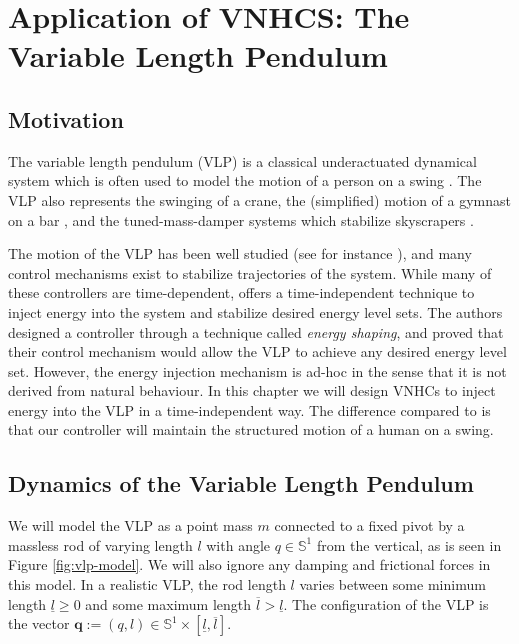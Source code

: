 
\chapter{Application of VNHCS: The Variable Length Pendulum}\label{sec:vlp}
\section{Motivation}
The variable length pendulum (VLP) is a classical underactuated dynamical system
which is often used to model the motion of a person on a swing
\cite{pumping_swing_standing_squatting,how_to_pump_a_swing}.
The VLP also represents the swinging of a crane, the (simplified) motion of a
gymnast on a bar \cite{pendulum_length_giant_gymnastics}, and the
tuned-mass-damper systems which stabilize skyscrapers
\cite{vlp_tuned_mass_damper}.

The motion of the VLP has been well studied (see for instance
\cite{dynamics_periodic_vlp}), and many control mechanisms exist
to stabilize trajectories of the system. While many of these controllers 
are time-dependent, \cite{vlp_energy_shaping}
offers a time-independent technique to inject energy into the system and
stabilize desired energy level sets. The authors designed a controller through a
technique called \textit{energy shaping}, and proved that their control
mechanism would allow the VLP to achieve any desired energy level set.
However, the energy injection mechanism is
ad-hoc in the sense that it is not derived from natural behaviour. In
this chapter we will design VNHCs to inject energy into the VLP in a
time-independent way.
The difference compared to \cite{vlp_energy_shaping} is that our 
controller will maintain the structured motion of a human on a swing.

\section{Dynamics of the Variable Length Pendulum}
We will model the VLP as a point mass \(m\)
connected to a fixed pivot by a massless rod of varying length \(l\) with angle 
\(q \in \mathbb{S}^1\) from the vertical, as is seen in Figure
\ref{fig:vlp-model}. 
We will also ignore any damping and frictional forces in this model.
In a realistic VLP, the rod length \(l\) varies between some minimum
length \(\underline{l} \geq 0\) and some maximum length 
\(\overline{l} > \underline{l}\). The configuration of the VLP is the vector
\(\mathbf{q} := (q,l) \in \mathbb{S}^1 \times [\underline{l},\overline{l}]\).

